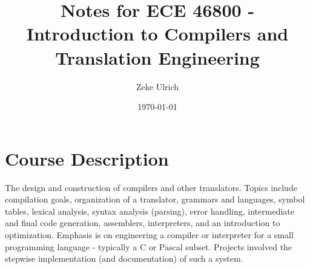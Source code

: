 \documentclass[nobib]{tufte-handout}
\title{Notes for ECE 46800 - Introduction to Compilers and Translation Engineering }
\author{Zeke Ulrich}
\date{\today}
\begin{document}
\maketitle

\tableofcontents

\section{Course Description}
The design and construction of compilers and other translators. Topics include compilation goals, organization of a translator, grammars and languages, symbol tables, lexical analysis, syntax analysis (parsing), error handling, intermediate and final code generation, assemblers, interpreters, and an introduction to optimization. Emphasis is on engineering a compiler or interpreter for a small programming language - typically a C or Pascal subset. Projects involved the stepwise implementation (and documentation) of such a system.

\pagebreak








\end{document}
